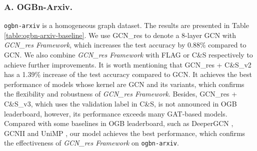 \documentclass[runningheads]{llncs}
\begin{document}
\subsubsection{A. OGBn-Arxiv.}
\texttt{ogbn-arxiv} is a homogeneous graph dataset. The results are presented in Table \ref{table:ogbn-arxiv-baseline}. We use GCN\_res to denote a 8-layer GCN with \textsl{GCN\_res
Framework}, which increases the test accuracy by 0.88\% compared to GCN. We also combine \textsl{GCN\_res Framework} with FLAG or C\&S
respectively to achieve further improvements. It is worth
mentioning that GCN\_res + C\&S\_v2 has a
1.39\% increase of the test accuracy compared to GCN. It achieves the best performance of models whose kernel are GCN and its variants, which confirms the
flexibility and robustness of \textsl{GCN\_res Framework}. Besides,
GCN\_res + C\&S\_v3, which uses the validation label in C\&S, is not announced in OGB leaderboard, however, its performance exceeds many GAT-based models. Compared with some baselines in OGB leaderboard, such as DeeperGCN \cite{li2020deepergcn}, GCNII \cite{chen2020simple} and UniMP \cite{shi2020masked}, our model achieves the best performance, which  confirms the effectiveness of \textsl{GCN\_res Framework} on \texttt{ogbn-arxiv}.
\end{document}

